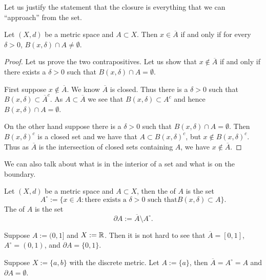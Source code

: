 Let us justify the statement that the closure is everything that we can
``approach'' from the set.

\begin{prop} \label{prop:msclosureappr}
Let $(X,d)$ be a metric space and $A \subset X$.  Then $x \in \overline{A}$
if and only if for every $\delta > 0$, $B(x,\delta) \cap A \not=\emptyset$.
\end{prop}

\begin{proof}
Let us prove the two contrapositives.
Let us show that $x \notin \overline{A}$ if and only if there exists
a $\delta > 0$ such that $B(x,\delta) \cap A = \emptyset$.

First suppose $x \notin \overline{A}$.  We know $\overline{A}$ is
closed.  Thus there is a $\delta > 0$ such that
$B(x,\delta) \subset \overline{A}^c$.  As $A \subset \overline{A}$ we
see that $B(x,\delta) \subset A^c$ and hence
$B(x,\delta) \cap A = \emptyset$.

On the other hand suppose there is a $\delta > 0$ such that
$B(x,\delta) \cap A = \emptyset$.  Then ${B(x,\delta)}^c$ is a closed set and we have
that $A \subset {B(x,\delta)}^c$, but
$x \notin {B(x,\delta)}^c$.  Thus as $\overline{A}$ is the intersection
of closed sets containing $A$, we have $x \notin \overline{A}$.
\end{proof}

We can also talk about what is in the interior of a set and what is on the
boundary.

\begin{defn}
Let $(X,d)$ be a metric space and $A \subset X$, then
the \emph{} of $A$ is the set
\begin{equation*}
A^\circ := \{ x \in A : \text{there exists a $\delta > 0$ such that
$B(x,\delta) \subset A$} \} .
\end{equation*}
The \emph{} of $A$ is the set
\begin{equation*}
\partial A := \overline{A}\setminus A^\circ.
\end{equation*}
\end{defn}

\begin{example}
Suppose $A:=(0,1]$ and $X := {\mathbb{R}}$.  Then it is not hard
to see that $\overline{A}=[0,1]$, $A^\circ = (0,1)$,
and $\partial A = \{ 0, 1 \}$.
\end{example}

\begin{example}
Suppose $X := \{ a, b \}$ with the discrete metric.
Let $A := \{ a \}$, then $\overline{A} = A^\circ = A$ and $\partial A =
\emptyset$.
\end{example}


